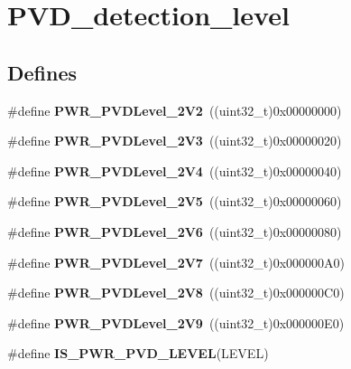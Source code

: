 \hypertarget{group__PVD__detection__level}{
\section{PVD\_\-detection\_\-level}
\label{group__PVD__detection__level}
}
\subsection*{Defines}
\begin{DoxyCompactItemize}
\item 
\hypertarget{group__PVD__detection__level_ga5cf8b09ed099c7412fcee6ccec2ec20b}{
\#define {\bfseries PWR\_\-PVDLevel\_\-2V2}~((uint32\_\-t)0x00000000)}
\label{group__PVD__detection__level_ga5cf8b09ed099c7412fcee6ccec2ec20b}

\item 
\hypertarget{group__PVD__detection__level_ga561e543dedb4c2cb126ec8d9d604260c}{
\#define {\bfseries PWR\_\-PVDLevel\_\-2V3}~((uint32\_\-t)0x00000020)}
\label{group__PVD__detection__level_ga561e543dedb4c2cb126ec8d9d604260c}

\item 
\hypertarget{group__PVD__detection__level_ga5b585e7e6eda29e8b119e16779ba7a8b}{
\#define {\bfseries PWR\_\-PVDLevel\_\-2V4}~((uint32\_\-t)0x00000040)}
\label{group__PVD__detection__level_ga5b585e7e6eda29e8b119e16779ba7a8b}

\item 
\hypertarget{group__PVD__detection__level_gad91e74c3034a5baccca70250815e680e}{
\#define {\bfseries PWR\_\-PVDLevel\_\-2V5}~((uint32\_\-t)0x00000060)}
\label{group__PVD__detection__level_gad91e74c3034a5baccca70250815e680e}

\item 
\hypertarget{group__PVD__detection__level_ga46174e5288082b59473068a3ca8e8ea6}{
\#define {\bfseries PWR\_\-PVDLevel\_\-2V6}~((uint32\_\-t)0x00000080)}
\label{group__PVD__detection__level_ga46174e5288082b59473068a3ca8e8ea6}

\item 
\hypertarget{group__PVD__detection__level_ga72d22a858d8289ef02fff45f4810b916}{
\#define {\bfseries PWR\_\-PVDLevel\_\-2V7}~((uint32\_\-t)0x000000A0)}
\label{group__PVD__detection__level_ga72d22a858d8289ef02fff45f4810b916}

\item 
\hypertarget{group__PVD__detection__level_ga5f38835a95c026b1db16dbebf81b45a2}{
\#define {\bfseries PWR\_\-PVDLevel\_\-2V8}~((uint32\_\-t)0x000000C0)}
\label{group__PVD__detection__level_ga5f38835a95c026b1db16dbebf81b45a2}

\item 
\hypertarget{group__PVD__detection__level_ga9c156a7155f9946c0d3a73794f51a1ce}{
\#define {\bfseries PWR\_\-PVDLevel\_\-2V9}~((uint32\_\-t)0x000000E0)}
\label{group__PVD__detection__level_ga9c156a7155f9946c0d3a73794f51a1ce}

\item 
\#define {\bfseries IS\_\-PWR\_\-PVD\_\-LEVEL}(LEVEL)
\end{DoxyCompactItemize}


